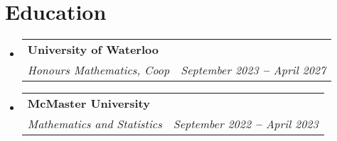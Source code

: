 \documentclass[letterpaper,11pt]{article}
\makeatletter
\newcommand{\resumeSubheading}[4]{
  \vspace{-2pt}\item
    \begin{tabular*}{0.97\textwidth}[t]{l@{\extracolsep{\fill}}r}
      \textbf{#1} & #2 \\
      \textit{\small#3} & \textit{\small #4} \\
    \end{tabular*}\vspace{-7pt}
}
\newcommand{\resumeSubHeadingListStart}{\begin{itemize}[leftmargin=0.15in, label={}]}
\newcommand{\resumeSubHeadingListEnd}{\end{itemize}}
\makeatother
\begin{document}
\section{Education}
  \resumeSubHeadingListStart
    \resumeSubheading
      {University of Waterloo}{}
      {Honours Mathematics, Coop}{September 2023 \textbf{--} April 2027}
    \resumeSubheading
      {McMaster University}{}
      {Mathematics and Statistics}{September 2022 \textbf{--} April 2023}

  \resumeSubHeadingListEnd



 
\end{document}
